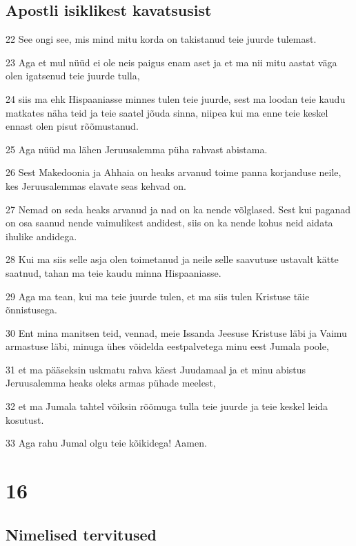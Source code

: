 \section*{Apostli isiklikest kavatsusist}

\par 22 See ongi see, mis mind mitu korda on takistanud teie juurde tulemast.
\par 23 Aga et mul nüüd ei ole neis paigus enam aset ja et ma nii mitu aastat väga olen igatsenud teie juurde tulla,
\par 24 siis ma ehk Hispaaniasse minnes tulen teie juurde, sest ma loodan teie kaudu matkates näha teid ja teie saatel jõuda sinna, niipea kui ma enne teie keskel ennast olen pisut rõõmustanud.
\par 25 Aga nüüd ma lähen Jeruusalemma püha rahvast abistama.
\par 26 Sest Makedoonia ja Ahhaia on heaks arvanud toime panna korjanduse neile, kes Jeruusalemmas elavate seas kehvad on.
\par 27 Nemad on seda heaks arvanud ja nad on ka nende võlglased. Sest kui paganad on osa saanud nende vaimulikest andidest, siis on ka nende kohus neid aidata ihulike andidega.
\par 28 Kui ma siis selle asja olen toimetanud ja neile selle saavutuse ustavalt kätte saatnud, tahan ma teie kaudu minna Hispaaniasse.
\par 29 Aga ma tean, kui ma teie juurde tulen, et ma siis tulen Kristuse täie õnnistusega.
\par 30 Ent mina manitsen teid, vennad, meie Issanda Jeesuse Kristuse läbi ja Vaimu armastuse läbi, minuga ühes võidelda eestpalvetega minu eest Jumala poole,
\par 31 et ma pääseksin uskmatu rahva käest Juudamaal ja et minu abistus Jeruusalemma heaks oleks armas pühade meelest,
\par 32 et ma Jumala tahtel võiksin rõõmuga tulla teie juurde ja teie keskel leida kosutust.
\par 33 Aga rahu Jumal olgu teie kõikidega! Aamen.


\chapter{16}

\section*{Nimelised tervitused}

